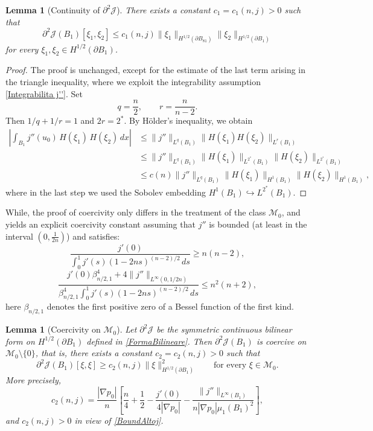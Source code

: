 \documentclass[oneside,a4paper,11pt,notitlepage]{article}
\theoremstyle{definition}
\theoremstyle{plain}
\newtheorem{lemma}[theorem]{Lemma}
\theoremstyle{definition}
\begin{document}
\begin{lemma}[Continuity of $\partial^2\mathcal{J}$]
There exists a constant $c_1=c_1(n,j)>0$ such that
\[
    \partial^2\mathcal{J}(B_1)[\xi_1,\xi_2]\leq c_1(n,j)\|\xi_1\|_{H^{1/2}(\partial B_81)}\|\xi_2\|_{H^{1/2}(\partial B_1)}
\]
for every $\xi_1,\xi_2\in H^{1/2}(\partial B_1)$.
\end{lemma}

\begin{proof}
The proof is unchanged, except for the estimate of the last term arising in the triangle inequality, where we exploit the integrability assumption \eqref{Integrabilita j''}. Set
\[
q=\frac n2,\qquad r=\frac{n}{n-2}.
\]
Then $1/q+1/r=1$ and $2r=2^\ast$. By H\"older's inequality, we obtain
\[
\begin{aligned}
\left|\int_{B_1} j''(u_0)\,H(\xi_1)\,H(\xi_2)\,dx\right|&\leq \|j''\|_{L^q(B_1)}\|H(\xi_1)H(\xi_2)\|_{L^r(B_1)} \\&\leq \|j''\|_{L^q(B_1)}\|H(\xi_1)\|_{L^{2^*}(B_1)}\|H(\xi_2)\|_{L^{2^*}(B_1)} \\&\leq c(n)\|j''\|_{L^q(B_1)}\|H(\xi_1)\|_{H^1(B_1)}\|H(\xi_2)\|_{H^1(B_1)},
\end{aligned}
\]
where in the last step we used the Sobolev embedding $H^1(B_1)\hookrightarrow L^{2^*}(B_1)$.
\end{proof}

While, the proof of coercivity only differs in the treatment of the class $\mathcal{M}_0$, and yields an explicit coercivity constant assuming that $j''$ is bounded (at least in the interval $\left(0,\frac{1}{2n}\right)$) and satisfies:
\begin{equation}\label{BoundBassoj}
    \dfrac{j'(0)}{\int_0^1j'(s)(1-2ns)^{(n-2)/2}\,ds}\geq n(n-2),
\end{equation}
\begin{equation}\label{BoundAltoj}
    \frac{j'(0)\beta_{n/2,1}^4+4\|j''\|_{L^\infty(0,1/2n)}}{\beta_{n/2,1}^4\int_0^1j'(s)(1-2ns)^{(n-2)/2}\,ds}\leq n^2(n+2),
\end{equation}
here $\beta_{n/2,1}$ denotes the first positive zero of a Bessel function of the first kind.
\begin{lemma}[Coercivity on $\mathcal{M}_0$]
Let $\partial^2\mathcal{J}$ be the symmetric continuous bilinear form on $H^{1/2}(\partial B_1)$ defined in \eqref{FormaBilineare}. Then $\partial^2\mathcal{J}(B_1)$ is coercive on $\mathcal M_0\setminus\{0\}$, that is, there exists a constant $c_2=c_2(n,j)>0$ such that
\[
    \partial^2\mathcal{J}(B_1)[\xi,\xi]\geq c_2(n,j)\|\xi\|_{H^{1/2}(\partial B_1)}^2\qquad\text{for every }\xi\in\mathcal M_0.
\]
More precisely,
\[
    c_2(n,j)=\frac{|\nabla p_0|}{n}\left[\frac n4+\frac12-\frac{j'(0)}{4|\nabla p_0|}-\frac{\|j''\|_{L^\infty(B_1)}}{n|\nabla p_0|\mu_1(B_1)^2}\right],
\]
and $c_2(n,j)>0$ in view of \eqref{BoundAltoj}.
\end{lemma}
\end{document}
